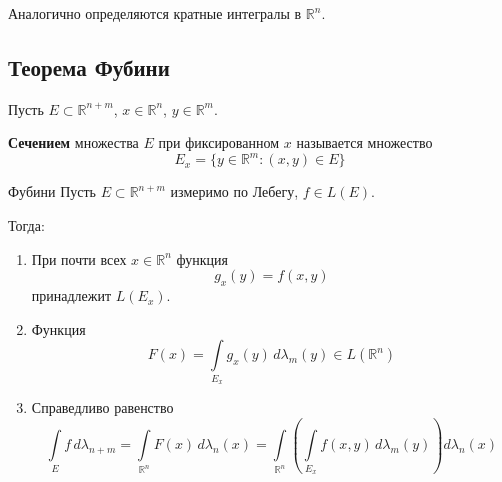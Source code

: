 \documentclass[12pt,a4paper]{article}
\begin{document}
Аналогично определяются кратные интегралы в $\mathbb R^n$.

\subsection{Теорема Фубини}

\begin{definition}
    Пусть $E\subset\mathbb R^{n+m}$,
    $x\in\mathbb R^n$, $y\in\mathbb R^m$.

    \textbf{Сечением} множества $E$ при фиксированном $x$
    называется множество
    \[
        E_x=\{y\in\mathbb R^m:(x,y)\in E\}
    \]
\end{definition}

\begin{theorem}{Фубини}
    Пусть $E\subset\mathbb R^{n+m}$ измеримо по Лебегу,
    $f\in L(E)$.

    Тогда:
    \begin{enumerate}
        \item При почти всех $x\in\mathbb R^n$ функция
        \[
            g_x(y)=f(x,y)
        \]
        принадлежит $L(E_x)$.

        \item Функция
        \[
            F(x)=\int\limits_{E_x}g_x(y)\,d\lambda_m(y) \in L(\mathbb R^n)
        \]

        \item Справедливо равенство
        \[
            \int\limits_E f\,d\lambda_{n+m}
            =
            \int\limits_{\mathbb R^n}F(x)\,d\lambda_n(x)
            =
            \int\limits_{\mathbb{R}^n}\left(\int\limits_{E_x}f(x,y)\,d\lambda_m(y)\right)d\lambda_n(x)
        \]
    \end{enumerate}
\end{theorem}
\end{document}
